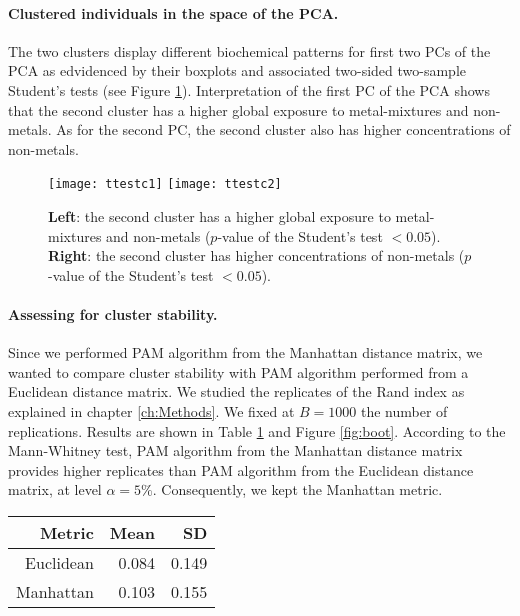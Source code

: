 \paragraph{Clustered individuals in the space of the PCA.}
The two clusters display different biochemical patterns for first two PCs of the PCA as edvidenced by their boxplots and associated two-sided two-sample Student’s tests (see Figure \ref{fig:ttestc1c2}). Interpretation of the first PC of the PCA shows that the second cluster has a higher global exposure to metal-mixtures and non-metals. As for the second PC, the second cluster also has higher concentrations of non-metals.

\begin{figure}
\centering
\captionsetup{singlelinecheck = false, format= hang, justification=raggedright, font=small, labelsep=space}
\texttt{[image: ttestc1]} \hfill
\texttt{[image: ttestc2]} 
\label{fig:ttestc1c2}
\begin{flushleft}
{\footnotesize \textbf{Left}: the second cluster has a higher global exposure to metal-mixtures and non-metals ($p$-value of the Student's test $<0.05$). \textbf{Right}: the second cluster has higher concentrations of non-metals ($p$-value of the Student's test $<0.05$).}
\end{flushleft}
\end{figure}

\paragraph{Assessing for cluster stability.}
Since we performed PAM algorithm from the Manhattan distance matrix, we wanted to compare cluster stability with PAM algorithm performed from a Euclidean distance matrix. We studied the replicates of the Rand index as explained in chapter \ref{ch:Methods}. We fixed at $B=1000$ the number of replications. Results are shown in Table \ref{table:bootr} and Figure \ref{fig:boot}. According to the Mann-Whitney test, PAM algorithm from the Manhattan distance matrix provides higher replicates than PAM algorithm from the Euclidean distance matrix, at level $\alpha=5\%$. Consequently, we kept the Manhattan metric.

\begin{table}
\centering
{}
\begin{tabular}{rrr}
\toprule
Metric  & Mean  & SD \\
\midrule
Euclidean & 0.084 &  0.149 \\
Manhattan & 0.103 & 0.155 \\
\bottomrule
\end{tabular}
\label{table:bootr}
\end{table}

